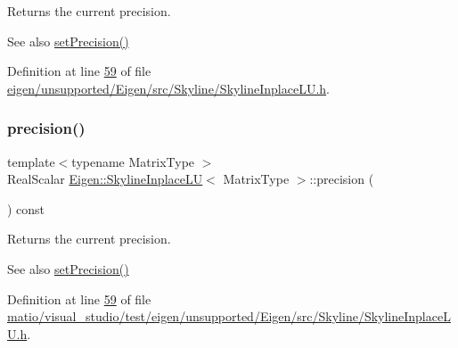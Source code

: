 \begin{DoxyReturn}{Returns}
the current precision.
\end{DoxyReturn}
\begin{DoxySeeAlso}{See also}
\hyperlink{class_eigen_1_1_skyline_inplace_l_u_a1c057a7dec39b8b196d49d7d411ea999}{set\+Precision()} 
\end{DoxySeeAlso}


Definition at line \hyperlink{eigen_2unsupported_2_eigen_2src_2_skyline_2_skyline_inplace_l_u_8h_source_l00059}{59} of file \hyperlink{eigen_2unsupported_2_eigen_2src_2_skyline_2_skyline_inplace_l_u_8h_source}{eigen/unsupported/\+Eigen/src/\+Skyline/\+Skyline\+Inplace\+L\+U.\+h}.

\mbox{\label{class_eigen_1_1_skyline_inplace_l_u_a050bcbe008f2ddeea4f6d5872e0daca5}} 
\subsubsection{\texorpdfstring{precision()}{precision()}\hspace{0.1cm}{\footnotesize\ttfamily [2/2]}}
{\footnotesize\ttfamily template$<$typename Matrix\+Type $>$ \\
Real\+Scalar \hyperlink{class_eigen_1_1_skyline_inplace_l_u}{Eigen\+::\+Skyline\+Inplace\+LU}$<$ Matrix\+Type $>$\+::precision (\begin{DoxyParamCaption}{ }\end{DoxyParamCaption}) const\hspace{0.3cm}{\ttfamily [inline]}}

\begin{DoxyReturn}{Returns}
the current precision.
\end{DoxyReturn}
\begin{DoxySeeAlso}{See also}
\hyperlink{class_eigen_1_1_skyline_inplace_l_u_a1c057a7dec39b8b196d49d7d411ea999}{set\+Precision()} 
\end{DoxySeeAlso}


Definition at line \hyperlink{matio_2visual__studio_2test_2eigen_2unsupported_2_eigen_2src_2_skyline_2_skyline_inplace_l_u_8h_source_l00059}{59} of file \hyperlink{matio_2visual__studio_2test_2eigen_2unsupported_2_eigen_2src_2_skyline_2_skyline_inplace_l_u_8h_source}{matio/visual\+\_\+studio/test/eigen/unsupported/\+Eigen/src/\+Skyline/\+Skyline\+Inplace\+L\+U.\+h}.


